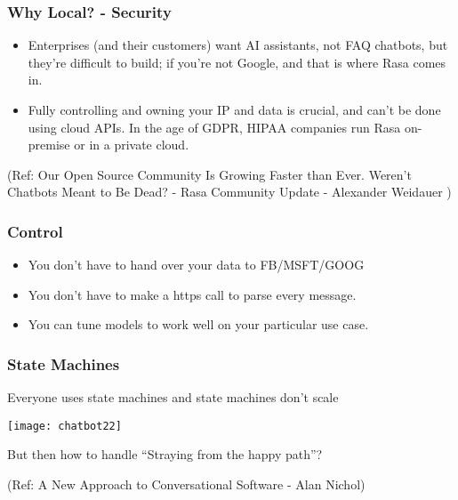  \begin{frame}[fragile]\frametitle{Why Local? - Security}
\begin{itemize}
\item Enterprises (and their customers) want AI assistants, not FAQ chatbots, but they're difficult to build; if you're not Google, and that is where Rasa comes in.
\item Fully controlling and owning your IP and data is crucial, and can't be done using cloud APIs. In the age of GDPR, HIPAA companies run Rasa on-premise or in a private cloud.
\end{itemize}

{\tiny (Ref: Our Open Source Community Is Growing Faster than Ever. Weren't Chatbots Meant to Be Dead? - Rasa Community Update - Alexander Weidauer )}
\end{frame}

 \begin{frame}[fragile]\frametitle{Control}
\begin{itemize}
\item You don't have to hand over your data to FB/MSFT/GOOG
\item You don't have to make a https call to parse every message.
\item You can tune models to work well on your particular use case.
\end{itemize}
\end{frame}


 \begin{frame}[fragile]\frametitle{State Machines}
Everyone uses state machines and state machines don't scale


\begin{center}
\texttt{[image: chatbot22]}

\end{center}

But then how to handle ``Straying from the happy path''?

{\tiny (Ref: A New Approach to Conversational Software - Alan Nichol)}
\end{frame}

